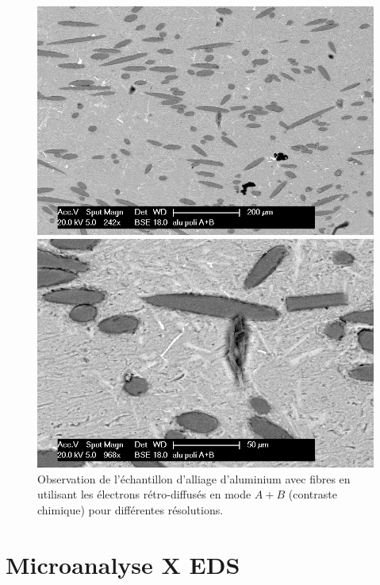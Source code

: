 \documentclass[a4paper,12pt]{article}
\begin{document}
\begin{figure}[h!]
\begin{minipage}[c]{.5\linewidth}
\centering
\includegraphics[width=1\textwidth]{images/alu_er_apb.png}
 \end{minipage}\hfill
\begin{minipage}[c]{.5\linewidth}
\centering
\includegraphics[width=1\textwidth]{images/alu_er_apb_g.png}
\end{minipage}
\caption{Observation de l'échantillon d'alliage d'aluminium avec fibres en utilisant les électrons rétro-diffusés en mode $A+B$ (contraste chimique) pour différentes résolutions.}
\label{fig:alu_poli_a+b}
\end{figure}

\newpage

\section{Microanalyse X EDS}
\end{document}
